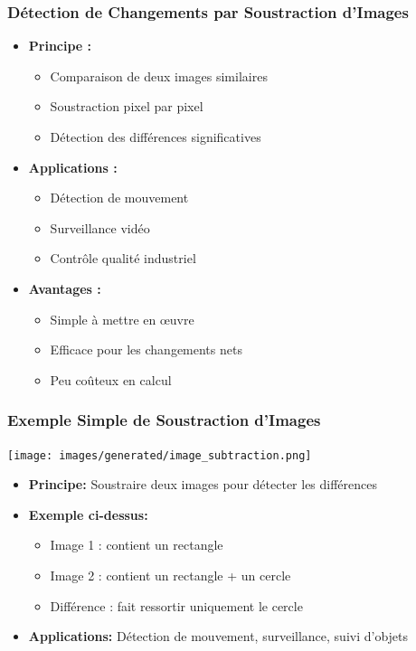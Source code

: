 \documentclass{beamer}
\begin{document}
\begin{frame}
    \frametitle{Détection de Changements par Soustraction d'Images}
    \begin{itemize}
        \item \textbf{Principe :}
        \begin{itemize}
            \item Comparaison de deux images similaires
            \item Soustraction pixel par pixel
            \item Détection des différences significatives
        \end{itemize}
        \item \textbf{Applications :}
        \begin{itemize}
            \item Détection de mouvement
            \item Surveillance vidéo
            \item Contrôle qualité industriel
        \end{itemize}
        \item \textbf{Avantages :}
        \begin{itemize}
            \item Simple à mettre en œuvre
            \item Efficace pour les changements nets
            \item Peu coûteux en calcul
        \end{itemize}
    \end{itemize}
\end{frame}

\begin{frame}
    \frametitle{Exemple Simple de Soustraction d'Images}
    \begin{center}
        \texttt{[image: images/generated/image\_subtraction.png]}
    \end{center}
    \begin{itemize}
        \item \textbf{Principe:} Soustraire deux images pour détecter les différences
        \item \textbf{Exemple ci-dessus:}
        \begin{itemize}
            \item Image 1 : contient un rectangle
            \item Image 2 : contient un rectangle + un cercle
            \item Différence : fait ressortir uniquement le cercle
        \end{itemize}
        \item \textbf{Applications:} Détection de mouvement, surveillance, suivi d'objets
    \end{itemize}
\end{frame}
\end{document}
